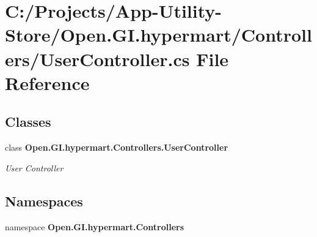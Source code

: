 \section{C\+:/\+Projects/\+App-\/\+Utility-\/\+Store/\+Open.G\+I.\+hypermart/\+Controllers/\+User\+Controller.cs File Reference}
\label{_user_controller_8cs}
\subsection*{Classes}
\begin{DoxyCompactItemize}
\item 
class \textbf{ Open.\+G\+I.\+hypermart.\+Controllers.\+User\+Controller}
\begin{DoxyCompactList}\small\item\em User Controller \end{DoxyCompactList}\end{DoxyCompactItemize}
\subsection*{Namespaces}
\begin{DoxyCompactItemize}
\item 
namespace \textbf{ Open.\+G\+I.\+hypermart.\+Controllers}
\end{DoxyCompactItemize}
